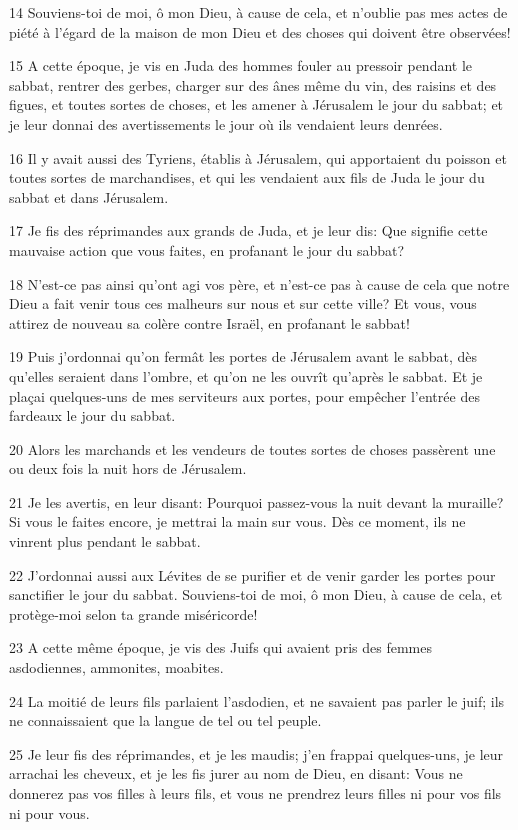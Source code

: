 \par 14 Souviens-toi de moi, ô mon Dieu, à cause de cela, et n'oublie pas mes actes de piété à l'égard de la maison de mon Dieu et des choses qui doivent être observées!
\par 15 A cette époque, je vis en Juda des hommes fouler au pressoir pendant le sabbat, rentrer des gerbes, charger sur des ânes même du vin, des raisins et des figues, et toutes sortes de choses, et les amener à Jérusalem le jour du sabbat; et je leur donnai des avertissements le jour où ils vendaient leurs denrées.
\par 16 Il y avait aussi des Tyriens, établis à Jérusalem, qui apportaient du poisson et toutes sortes de marchandises, et qui les vendaient aux fils de Juda le jour du sabbat et dans Jérusalem.
\par 17 Je fis des réprimandes aux grands de Juda, et je leur dis: Que signifie cette mauvaise action que vous faites, en profanant le jour du sabbat?
\par 18 N'est-ce pas ainsi qu'ont agi vos père, et n'est-ce pas à cause de cela que notre Dieu a fait venir tous ces malheurs sur nous et sur cette ville? Et vous, vous attirez de nouveau sa colère contre Israël, en profanant le sabbat!
\par 19 Puis j'ordonnai qu'on fermât les portes de Jérusalem avant le sabbat, dès qu'elles seraient dans l'ombre, et qu'on ne les ouvrît qu'après le sabbat. Et je plaçai quelques-uns de mes serviteurs aux portes, pour empêcher l'entrée des fardeaux le jour du sabbat.
\par 20 Alors les marchands et les vendeurs de toutes sortes de choses passèrent une ou deux fois la nuit hors de Jérusalem.
\par 21 Je les avertis, en leur disant: Pourquoi passez-vous la nuit devant la muraille? Si vous le faites encore, je mettrai la main sur vous. Dès ce moment, ils ne vinrent plus pendant le sabbat.
\par 22 J'ordonnai aussi aux Lévites de se purifier et de venir garder les portes pour sanctifier le jour du sabbat. Souviens-toi de moi, ô mon Dieu, à cause de cela, et protège-moi selon ta grande miséricorde!
\par 23 A cette même époque, je vis des Juifs qui avaient pris des femmes asdodiennes, ammonites, moabites.
\par 24 La moitié de leurs fils parlaient l'asdodien, et ne savaient pas parler le juif; ils ne connaissaient que la langue de tel ou tel peuple.
\par 25 Je leur fis des réprimandes, et je les maudis; j'en frappai quelques-uns, je leur arrachai les cheveux, et je les fis jurer au nom de Dieu, en disant: Vous ne donnerez pas vos filles à leurs fils, et vous ne prendrez leurs filles ni pour vos fils ni pour vous.
